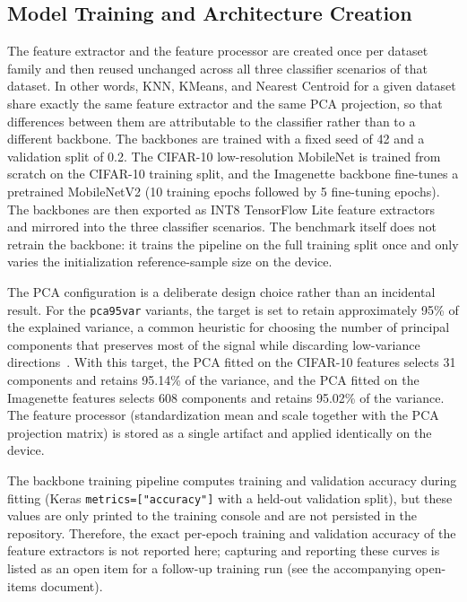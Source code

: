 \documentclass[sigconf,review]{acmart}
\begin{document}
\subsection{Model Training and Architecture Creation}
\label{sec:training}
The feature extractor and the feature processor are created once per dataset family and then reused unchanged across all three classifier scenarios of that dataset.
In other words, KNN, KMeans, and Nearest Centroid for a given dataset share exactly the same feature extractor and the same PCA projection, so that differences between them are attributable to the classifier rather than to a different backbone.
The backbones are trained with a fixed seed of 42 and a validation split of 0.2.
The CIFAR-10 low-resolution MobileNet is trained from scratch on the CIFAR-10 training split, and the Imagenette backbone fine-tunes a pretrained MobileNetV2 (10 training epochs followed by 5 fine-tuning epochs).
The backbones are then exported as INT8 TensorFlow Lite feature extractors and mirrored into the three classifier scenarios.
The benchmark itself does not retrain the backbone: it trains the pipeline on the full training split once and only varies the initialization reference-sample size on the device.

The PCA configuration is a deliberate design choice rather than an incidental result.
For the \texttt{pca95var} variants, the target is set to retain approximately 95\% of the explained variance, a common heuristic for choosing the number of principal components that preserves most of the signal while discarding low-variance directions~\cite{jolliffe2002pca}.
With this target, the PCA fitted on the CIFAR-10 features selects 31 components and retains 95.14\% of the variance, and the PCA fitted on the Imagenette features selects 608 components and retains 95.02\% of the variance.
The feature processor (standardization mean and scale together with the PCA projection matrix) is stored as a single artifact and applied identically on the device.

The backbone training pipeline computes training and validation accuracy during fitting (Keras \texttt{metrics=["accuracy"]} with a held-out validation split), but these values are only printed to the training console and are not persisted in the repository.
Therefore, the exact per-epoch training and validation accuracy of the feature extractors is not reported here; capturing and reporting these curves is listed as an open item for a follow-up training run (see the accompanying open-items document).
\end{document}

